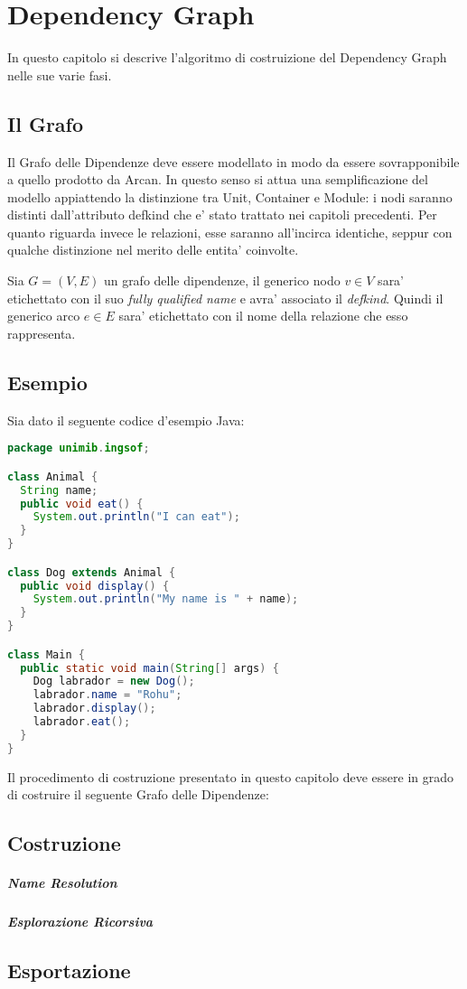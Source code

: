 \chapter{Dependency Graph}

In questo capitolo si descrive l'algoritmo di costruizione del Dependency Graph nelle sue varie fasi.

\section{Il Grafo}

Il Grafo delle Dipendenze deve essere modellato in modo da essere sovrapponibile a quello prodotto da Arcan.
In questo senso si attua una semplificazione del modello appiattendo la distinzione tra Unit, Container e Module: i nodi saranno distinti dall'attributo defkind che e' stato trattato nei capitoli precedenti.
Per quanto riguarda invece le relazioni, esse saranno all'incirca identiche, seppur con qualche distinzione nel merito delle entita' coinvolte.

Sia $G = (V, E)$ un grafo delle dipendenze, il generico nodo $v \in V$ sara' etichettato con il suo \emph{fully qualified name} e avra' associato il \emph{defkind}.
Quindi il generico arco $e \in E$ sara' etichettato con il nome della relazione che esso rappresenta.

\section{Esempio}

Sia dato il seguente codice d'esempio Java:

\begin{lstlisting}[language=Java]
package unimib.ingsof;

class Animal {
  String name;
  public void eat() {
    System.out.println("I can eat");
  }
}

class Dog extends Animal {
  public void display() {
    System.out.println("My name is " + name);
  }
}

class Main {
  public static void main(String[] args) {
    Dog labrador = new Dog();
    labrador.name = "Rohu";
    labrador.display();
    labrador.eat();
  }
}
\end{lstlisting}

Il procedimento di costruzione presentato in questo capitolo deve essere in grado di costruire il seguente Grafo delle Dipendenze:


\section{Costruzione}

\paragraph{Name Resolution}

\paragraph{Esplorazione Ricorsiva}

\section{Esportazione}
